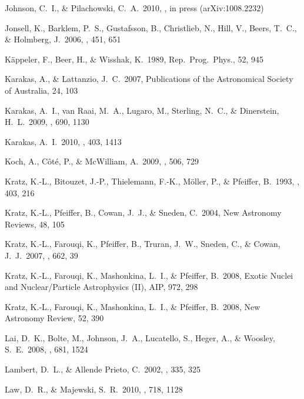 \documentclass{emulateapj}
\begin{document}
\begin{thebibliography}{}
 Johnson, C.~I., \& 
Pilachowski, C.~A.\ 2010, \apj, in press (arXiv:1008.2232)

 Jonsell, K., Barklem, P.~S., 
Gustafsson, B., Christlieb, N., Hill, V., Beers, T.~C., \& Holmberg, J.\ 
2006, \aap, 451, 651 

 K\"{a}ppeler, F., 
Beer, H., \& Wisshak, K.\ 1989, Rep.\ Prog.\ Phys., 52, 945

 Karakas, A., \& 
Lattanzio, J.~C.\ 2007, Publications of the Astronomical Society of 
Australia, 24, 103 

 Karakas, A.~I., 
van Raai, M.~A., Lugaro, M., Sterling, N.~C., \& Dinerstein, H.~L.\ 
2009, \apj, 690, 1130 

 Karakas, A.~I.\ 2010, \mnras, 403, 1413 

\bibitem[Koch et al.(2009)]{koch09} Koch, A., C{\^o}t{\'e}, P., \& 
McWilliam, A.\ 2009, \aap, 506, 729 

 Kratz, K.-L., Bitouzet, 
J.-P., Thielemann, F.-K., M\"{o}ller, P., 
\& Pfeiffer, B.\ 1993, \apj, 403, 216 

 Kratz, K.-L., Pfeiffer, 
B., Cowan, J.~J., \& Sneden, C.\ 2004, New Astronomy Reviews, 48, 105 

\bibitem[Kratz et al.(2007)]{kratz07} Kratz, K.-L., Farouqi, 
K., Pfeiffer, B., Truran, J.~W., Sneden, C., 
\& Cowan, J.~J.\ 2007, \apj, 662, 39 

 Kratz, K.-L., Farouqi, 
K., Mashonkina, L.~I., \& Pfeiffer, B.\ 2008, Exotic Nuclei and 
Nuclear/Particle Astrophysics (II), AIP, 972, 298 

 Kratz, K.-L., Farouqi, 
K., Mashonkina, L.~I., \& Pfeiffer, B.\ 2008, New Astronomy Review, 52, 390 

\bibitem[Lai et al.(2008)]{lai08} Lai, D.~K., Bolte, M., 
Johnson, J.~A., Lucatello, S., Heger, A., 
\& Woosley, S.~E.\ 2008, \apj, 681, 1524 

 Lambert, D.~L., \& 
Allende Prieto, C.\ 2002, \mnras, 335, 325 

 Law, D.~R., \& Majewski, S.~R.\ 
2010, \apj, 718, 1128 


\end{thebibliography}
\end{document}
